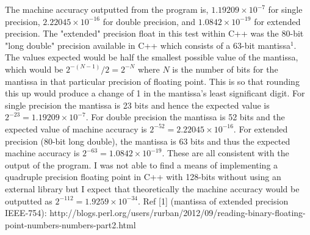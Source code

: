 \documentclass{article}
\begin{document}
The machine accuracy outputted from the program is, $1.19209\times{10^{-7}}$ for single precision,  $2.22045\times{10^{-16}}$ for double precision, and $1.0842\times{10^{-19}}$ for extended precision. The "extended" precision float in this test within C++  was the 80-bit "long double" precision available in C++ which consists of a 63-bit mantissa$^1$. The values expected would be half the smallest possible value of the mantissa, which would be $2^{-(N-1)}/2=2^{-N}$ where $N$ is the number of bits for the mantissa in that particular precision of floating point. This is so that rounding this up would produce a change of 1 in the mantissa’s least significant digit. For single precision the mantissa is 23 bits and hence the expected value is $2^{-23}=1.19209\times{10^{-7}}$. For double precision the mantissa is 52 bits and the expected value of machine accuracy is $2^{-52}=2.22045\times{10^{-16}}$. For extended precision (80-bit long double), the mantissa is 63 bits and thus the expected machine accuracy is  $2^{-63}=1.0842\times{10^{-19}}$. These are all consistent with the output of the program. I was not able to find a means of implementing a quadruple precision floating point in C++ with 128-bits without using an external library but I expect that theoretically the machine accuracy would be outputted as $2^{-112}=1.9259\times{10^{-34}}$.
\newline
\newline
Ref [1] (mantissa of extended precision IEEE-754): http://blogs.perl.org/users/rurban/2012/09/reading-binary-floating-point-numbers-numbers-part2.html 
\end{document}
